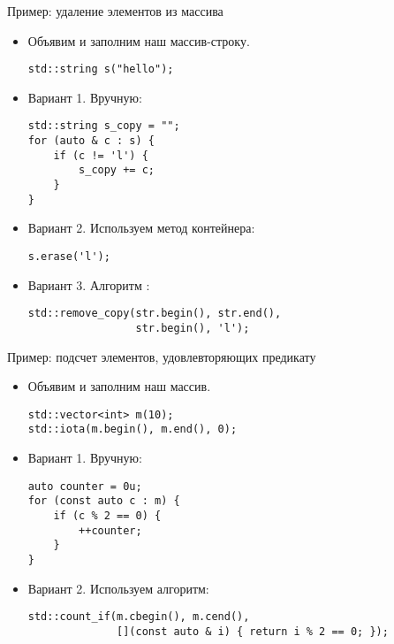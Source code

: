 \documentclass{beamer}
\begin{document}
\begin{frame}[fragile]{Пример: удаление элементов из массива}
    \begin{itemize}
        \item Объявим и заполним наш массив-строку.
            \begin{lstlisting}
std::string s("hello");
            \end{lstlisting}
        \item Вариант 1. Вручную:
            \begin{lstlisting}
std::string s_copy = "";
for (auto & c : s) {
    if (c != 'l') {
        s_copy += c;
    }
}
            \end{lstlisting}
        \item Вариант 2. Используем метод контейнера:
            \begin{lstlisting}
s.erase('l');
            \end{lstlisting}
        \item Вариант 3. Алгоритм :
            \begin{lstlisting}
std::remove_copy(str.begin(), str.end(),
                 str.begin(), 'l');
            \end{lstlisting}
    \end{itemize}
\end{frame}

\begin{frame}[fragile]{Пример: подсчет элементов, удовлевторяющих предикату}
    \begin{itemize}
        \item Объявим и заполним наш массив.
            \begin{lstlisting}
std::vector<int> m(10);
std::iota(m.begin(), m.end(), 0);
            \end{lstlisting}
        \item Вариант 1. Вручную:
            \begin{lstlisting}
auto counter = 0u;
for (const auto c : m) {
    if (c % 2 == 0) {
        ++counter;
    }
}
            \end{lstlisting}
        \item Вариант 2. Используем алгоритм:
            \begin{lstlisting}
std::count_if(m.cbegin(), m.cend(),
              [](const auto & i) { return i % 2 == 0; });
            \end{lstlisting}
    \end{itemize}
\end{frame}
\end{document}
